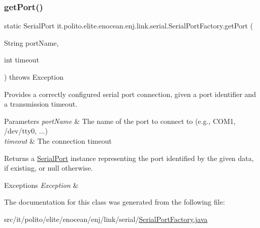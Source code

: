 \subsubsection{\texorpdfstring{get\+Port()}{getPort()}}
{\footnotesize\ttfamily static Serial\+Port it.\+polito.\+elite.\+enocean.\+enj.\+link.\+serial.\+Serial\+Port\+Factory.\+get\+Port (\begin{DoxyParamCaption}\item[{String}]{port\+Name,  }\item[{int}]{timeout }\end{DoxyParamCaption}) throws Exception\hspace{0.3cm}{\ttfamily [static]}}

Provides a correctly configured serial port connection, given a port identifier and a transmission timeout.


\begin{DoxyParams}{Parameters}
{\em port\+Name} & The name of the port to connect to (e.\+g., C\+O\+M1, /dev/tty0, ...) \\
\hline
{\em timeout} & The connection timeout \\
\hline
\end{DoxyParams}
\begin{DoxyReturn}{Returns}
a \hyperlink{}{Serial\+Port} instance representing the port identified by the given data, if existing, or null otherwise. 
\end{DoxyReturn}

\begin{DoxyExceptions}{Exceptions}
{\em Exception} & \\
\hline
\end{DoxyExceptions}


The documentation for this class was generated from the following file\+:\begin{DoxyCompactItemize}
\item 
src/it/polito/elite/enocean/enj/link/serial/\hyperlink{_serial_port_factory_8java}{Serial\+Port\+Factory.\+java}\end{DoxyCompactItemize}
